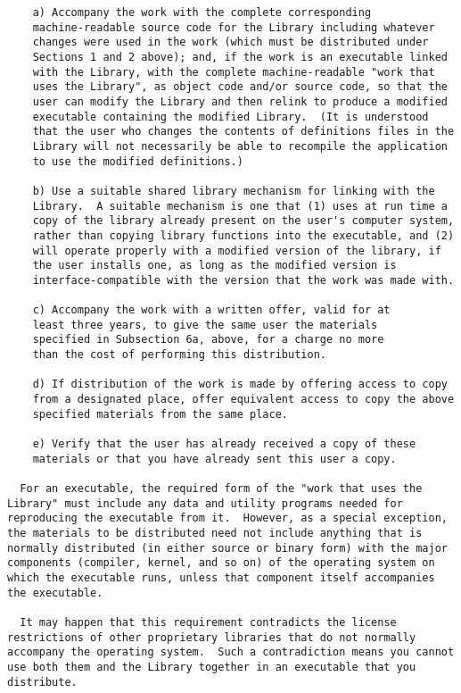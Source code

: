 \documentclass{InsightBook}
\begin{document}
\begin{verbatim}
    a) Accompany the work with the complete corresponding
    machine-readable source code for the Library including whatever
    changes were used in the work (which must be distributed under
    Sections 1 and 2 above); and, if the work is an executable linked
    with the Library, with the complete machine-readable "work that
    uses the Library", as object code and/or source code, so that the
    user can modify the Library and then relink to produce a modified
    executable containing the modified Library.  (It is understood
    that the user who changes the contents of definitions files in the
    Library will not necessarily be able to recompile the application
    to use the modified definitions.)

    b) Use a suitable shared library mechanism for linking with the
    Library.  A suitable mechanism is one that (1) uses at run time a
    copy of the library already present on the user's computer system,
    rather than copying library functions into the executable, and (2)
    will operate properly with a modified version of the library, if
    the user installs one, as long as the modified version is
    interface-compatible with the version that the work was made with.

    c) Accompany the work with a written offer, valid for at
    least three years, to give the same user the materials
    specified in Subsection 6a, above, for a charge no more
    than the cost of performing this distribution.

    d) If distribution of the work is made by offering access to copy
    from a designated place, offer equivalent access to copy the above
    specified materials from the same place.

    e) Verify that the user has already received a copy of these
    materials or that you have already sent this user a copy.

  For an executable, the required form of the "work that uses the
Library" must include any data and utility programs needed for
reproducing the executable from it.  However, as a special exception,
the materials to be distributed need not include anything that is
normally distributed (in either source or binary form) with the major
components (compiler, kernel, and so on) of the operating system on
which the executable runs, unless that component itself accompanies
the executable.

  It may happen that this requirement contradicts the license
restrictions of other proprietary libraries that do not normally
accompany the operating system.  Such a contradiction means you cannot
use both them and the Library together in an executable that you
distribute.


\end{verbatim}
\end{document}

